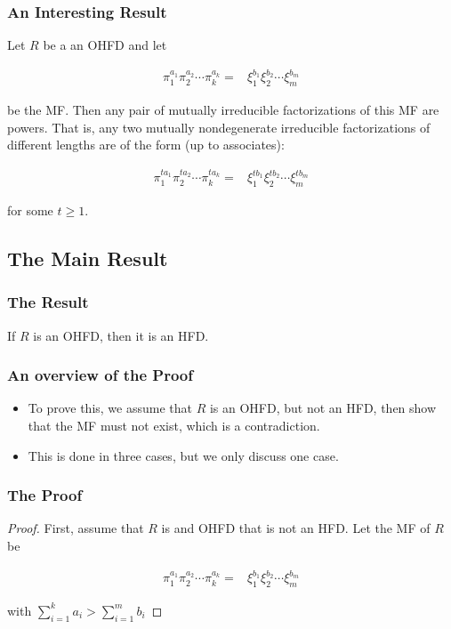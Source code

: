 \begin{frame}
  \frametitle{An Interesting Result }
  \begin{fact}
    Let $R$ be a an OHFD and let

    \begin{align*}
      \pi_{1}^{a_{1}}\pi_{2}^{a_{2}}\cdots\pi_{k}^{a_{k}}= & \xi_{1}^{b_{1}}\xi_{2}^{b_{2}}\cdots\xi_{m}^{b_{m}}
    \end{align*}

    be the MF.
    Then any pair of mutually irreducible factorizations of this MF are powers.
    That is, any two mutually nondegenerate irreducible factorizations of different lengths are of the form (up to associates):

    \begin{align*}
      \pi_{1}^{ta_{1}}\pi_{2}^{ta_{2}}\cdots\pi_{k}^{ta_{k}}= & \xi_{1}^{tb_{1}}\xi_{2}^{tb_{2}}\cdots\xi_{m}^{tb_{m}}
    \end{align*}

    for some $t\geq1$.
  \end{fact}
\end{frame}

\subsection{The Main Result}
\begin{frame}
  \frametitle{The Result}
  \begin{theorem}
    If $R$ is an OHFD, then it is an HFD.
  \end{theorem}
\end{frame}

\begin{frame}
  \frametitle{An overview of the Proof}
  \begin{itemize}
    \item To prove this, we assume that $R$ is an OHFD, but not an HFD, then show that the MF must not exist, which is a contradiction.
    \item This is done in three cases, but we only discuss one case.
  \end{itemize}
\end{frame}

\begin{frame}
  \frametitle{The Proof}
  \begin{proof}
    First, assume that $R$ is and OHFD that is not an HFD. Let the MF of $R$ be 

    \begin{align*}
      \pi_{1}^{a_{1}}\pi_{2}^{a_{2}}\cdots\pi_{k}^{a_{k}}= & \xi_{1}^{b_{1}}\xi_{2}^{b_{2}}\cdots\xi_{m}^{b_{m}}
    \end{align*}

    with $\sum_{i=1}^{k}a_{i}>\sum_{i=1}^{m}b_{i}$
    \noqedsymbol
  \end{proof}
\end{frame}

